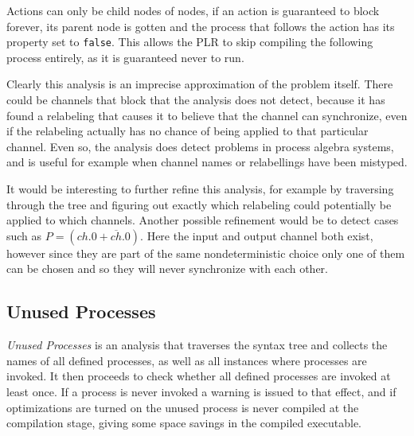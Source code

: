 	Actions can only be child nodes of  nodes, if an 
	action is guaranteed to block forever, its parent 
	node is gotten and the process that follows the action has its 
	 property set to \texttt{false}. This allows the PLR to skip
	compiling the following process entirely, as it is guaranteed never to run.
	 
	Clearly this analysis is an imprecise approximation of the problem itself. 
	There could be channels that block that the analysis does not detect, because
	it has found a relabeling that causes it to believe that the channel can 
	synchronize, even if the relabeling actually has no chance of being applied
	to that particular channel. Even so, the analysis does detect problems in
	process algebra systems, and is useful for example when channel names or
	relabellings have been mistyped.
	
	It would be interesting to further refine this analysis, for example by 
	traversing through the tree and figuring out exactly which relabeling
	could potentially be applied to which channels. Another possible refinement
	would be to detect cases such as $P = (ch.0+\overline{ch}.0)$. Here the
	input and output channel both exist, however since they are part of the
	same nondeterministic choice only one of them can be chosen and so they
	will never synchronize with each other.

\subsection{Unused Processes}

	\textit{Unused Processes} is an analysis that traverses the syntax tree and
	collects the names of all defined processes, as well as all instances where
	processes are invoked. It then proceeds to check whether all defined 
	processes are invoked at least once. If a process is never invoked a warning 
	is issued to that effect, and if optimizations are turned on the unused 
	process is never compiled at the compilation stage, giving some space 
	savings in the compiled executable.
